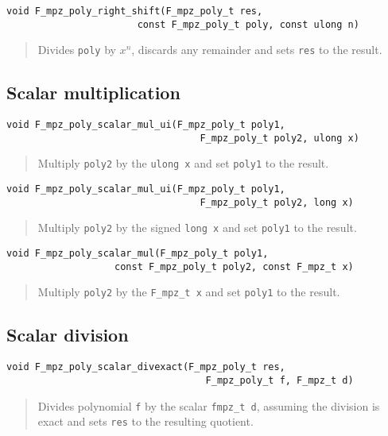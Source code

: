 \documentclass[a4paper,10pt]{article}
\newcommand{\code}{\lstinline}
\begin{document}
\begin{lstlisting}
void F_mpz_poly_right_shift(F_mpz_poly_t res,
                       const F_mpz_poly_t poly, const ulong n)
\end{lstlisting}
\begin{quote}
Divides \code{poly} by $x^n$, discards any remainder and sets \code{res} to the result.
\end{quote}

\subsection{Scalar multiplication}

\begin{lstlisting}
void F_mpz_poly_scalar_mul_ui(F_mpz_poly_t poly1,
                                  F_mpz_poly_t poly2, ulong x)
\end{lstlisting}
\begin{quote}
Multiply \code{poly2} by the \code{ulong x} and set \code{poly1} to the result.
\end{quote}

\begin{lstlisting}
void F_mpz_poly_scalar_mul_ui(F_mpz_poly_t poly1,
                                  F_mpz_poly_t poly2, long x)
\end{lstlisting}
\begin{quote}
Multiply \code{poly2} by the signed \code{long x} and set \code{poly1} to the result.
\end{quote}

\begin{lstlisting}
void F_mpz_poly_scalar_mul(F_mpz_poly_t poly1, 
                   const F_mpz_poly_t poly2, const F_mpz_t x)
\end{lstlisting}
\begin{quote}
Multiply \code{poly2} by the \code{F_mpz_t x} and set \code{poly1} to the result.
\end{quote}

\subsection{Scalar division}

\begin{lstlisting}
void F_mpz_poly_scalar_divexact(F_mpz_poly_t res,
                                   F_mpz_poly_t f, F_mpz_t d)
\end{lstlisting}
\begin{quote}
Divides polynomial \code{f} by the scalar \code{fmpz_t d}, assuming the division is exact and sets 
\code{res} to the resulting quotient.
\end{quote}
\end{document}
